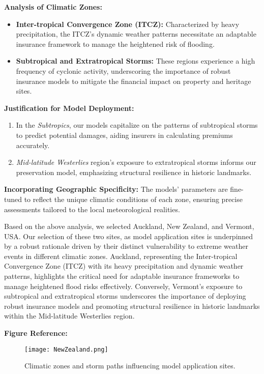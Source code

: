 \documentclass{mcmthesis}
\begin{document}
\textbf{Analysis of Climatic Zones:}
\begin{itemize}
    \item \textbf{Inter-tropical Convergence Zone (ITCZ):} Characterized by heavy precipitation, the ITCZ's dynamic weather patterns necessitate an adaptable insurance framework to manage the heightened risk of flooding.
    \item \textbf{Subtropical and Extratropical Storms:} These regions experience a high frequency of cyclonic activity, underscoring the importance of robust insurance models to mitigate the financial impact on property and heritage sites.
\end{itemize}

\textbf{Justification for Model Deployment:}
\begin{enumerate}
    \item In the \textit{Subtropics}, our models capitalize on the patterns of subtropical storms to predict potential damages, aiding insurers in calculating premiums accurately.
    \item \textit{Mid-latitude Westerlies} region's exposure to extratropical storms informs our preservation model, emphasizing structural resilience in historic landmarks.
\end{enumerate}

\textbf{Incorporating Geographic Specificity:}
The models' parameters are fine-tuned to reflect the unique climatic conditions of each zone, ensuring precise assessments tailored to the local meteorological realities.

Based on the above analysis, we selected Auckland, New Zealand, and Vermont, USA. Our selection of these two sites, as model application sites is underpinned by a robust rationale driven by their distinct vulnerability to extreme weather events in different climatic zones. Auckland, representing the Inter-tropical Convergence Zone (ITCZ) with its heavy precipitation and dynamic weather patterns, highlights the critical need for adaptable insurance frameworks to manage heightened flood risks effectively. Conversely, Vermont's exposure to subtropical and extratropical storms underscores the importance of deploying robust insurance models and promoting structural resilience in historic landmarks within the Mid-latitude Westerlies region.

\textbf{Figure Reference:}
\begin{figure}[h]
    \centering
    \texttt{[image: NewZealand.png]}
    \caption{Climatic zones and storm paths influencing model application sites.}
    \label{fig:climatic_zones}
\end{figure}
\end{document}
